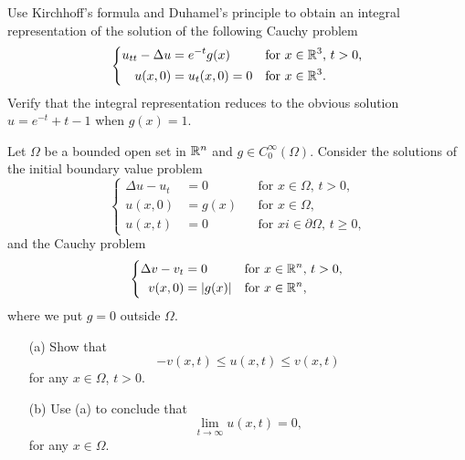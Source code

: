 \begin{problem}
  Use Kirchhoff's formula and Duhamel's principle to obtain an integral
  representation of the solution of the following Cauchy problem
  \[
    \left\{
      \begin{aligned}
        u_{tt}-\Delta u&=e^{-t} g(x)&&\text{for \(x\in\mathbb{R}^3\), \(t>0\),}\\
        u(x,0)&=u_t(x,0)=0&&\text{for \(x\in\mathbb{R}^3\).}
      \end{aligned}
    \right.
  \]
  Verify that the integral representation reduces to the obvious solution
  \(u=e^{-t}+t-1\) when \(g(x)=1\).
\end{problem}
\begin{solution}
\end{solution}

\begin{problem}
  Let \(\Omega\) be a bounded open set in \(\mathbb{R}^n\) and \(g\in
  C_0^\infty(\Omega)\). Consider the solutions of the initial boundary
  value problem
  \[
    \left\{
      \begin{aligned}
        \Delta u-u_t&=0&&\text{for \(x\in\Omega\), \(t>0\),}\\
        u(x,0)&=g(x)&&\text{for \(x\in\Omega\),}\\
        u(x,t)&=0&&\text{for \(xi\in\partial\Omega\), \(t\geq 0\),}
      \end{aligned}
    \right.
  \]
  and the Cauchy problem
  \[
    \left\{
      \begin{aligned}
        \Delta v-v_t&=0&&\text{for \(x\in\mathbb{R}^n\), \(t>0\),}\\
        v(x,0)&=|g(x)|&&\text{for \(x\in\mathbb{R}^n\),}
      \end{aligned}
    \right.
  \]
  where we put \(g=0\) outside \(\Omega\).
  \begin{itemize}[noitemsep]
  \item[(a)] Show that
    \[
      -v(x,t)\leq u(x,t)\leq v(x,t)
    \]
    for any \(x\in\Omega\), \(t>0\).
  \item[(b)] Use (a) to conclude that
    \[
      \lim_{t\to\infty} u(x,t)=0,
    \]
    for any \(x\in\Omega\).
  \end{itemize}
\end{problem}
\begin{solution}
\end{solution}

